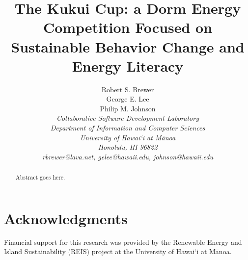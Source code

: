 \documentclass[10pt,conference,peerreview]{IEEEtran}
\begin{document}
\title{The Kukui Cup: a Dorm Energy Competition Focused on Sustainable Behavior Change and Energy Literacy}

\author{Robert S. Brewer\\
        George E. Lee \\
        Philip M. Johnson\\
\em     Collaborative Software Development Laboratory\\
        Department of Information and Computer Sciences\\
        University of Hawai`i at M\=anoa\\
        Honolulu, HI 96822\\
        rbrewer@lava.net, gelee@hawaii.edu, johnson@hawaii.edu\\
}


\IEEEpeerreviewmaketitle

\begin{abstract}  %
Abstract goes here.
\end{abstract}







\section{Acknowledgments}

Financial support for this research was provided by the Renewable Energy and
Island Sustainability (REIS) project at the University of Hawai`i at M\=anoa.



\end{document}
